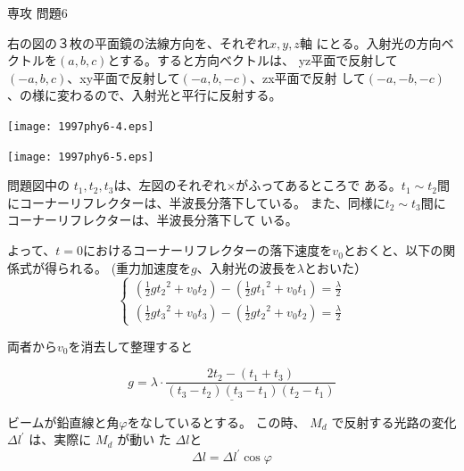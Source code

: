 \documentclass[fleqn]{jbook}
\begin{document}
\begin{answer}{専攻 問題6}{}
\begin{subanswers}
%
\SubAnswer

\parbox[t]{110mm}{右の図の３枚の平面鏡の法線方向を、それぞれ$x,y,z$軸
にとる。入射光の方向ベクトルを$(a,b,c )$とする。すると方向ベクトルは、
yz平面で反射して$(-a,b,c)$、xy平面で反射して$(-a,b,-c)$、zx平面で反射
して$(-a,-b,-c)$、の様に変わるので、入射光と平行に反射する。}\parbox[t]{10mm}
{\vspace*{-5mm}
\begin{center}
\texttt{[image: 1997phy6-4.eps]}
\end{center}
}

\SubAnswer

\parbox[t]{50mm}{\vspace*{-15mm}
\begin{center}
\texttt{[image: 1997phy6-5.eps]}
\end{center}}\parbox[t]{110mm}{
問題図中の $t_1,t_2,t_3$は、左図のそれぞれ$\times$がふってあるところで
ある。$t_1 \sim t_2$間にコーナーリフレクターは、半波長分落下している。
また、同様に$t_2 \sim t_3$間にコーナーリフレクターは、半波長分落下して
いる。

よって、$t=0$におけるコーナーリフレクターの落下速度を$v_0$とおくと、以下の関係式が得られる。
(重力加速度を$g$、入射光の波長を$\lambda$とおいた）
\[\left\{
  \begin{array}{l}
    (\frac{1}{2} g{t_2}^2+v_0t_2)-(\frac{1}{2} g{t_1}^2+v_0t_1)= \frac{\lambda}{
2} \\
    (\frac{1}{2} g{t_3}^2+v_0t_3)-(\frac{1}{2} g{t_2}^2+v_0t_2)= \frac{\lambda}{
2}
  \end{array}
\right. \]
}

両者から$v_0$を消去して整理すると

\[\underline{g = \lambda \cdot \frac{2t_2-(t_1+t_3)}{(t_3-t_2)(t_3-t_1)(t_2-t_1)
}}\]
%
\SubAnswer

\parbox[t]{100mm}{ビームが鉛直線と角$\varphi$をなしているとする。
この時、 $M_d$ で反射する光路の変化 $\Delta l^{\prime}$ は、実際に $M_d$ が動い
た $\Delta l$と
\[\Delta l = \Delta l^{'} \cos \varphi\]

}
\end{subanswers}
\end{answer}
\end{document}
